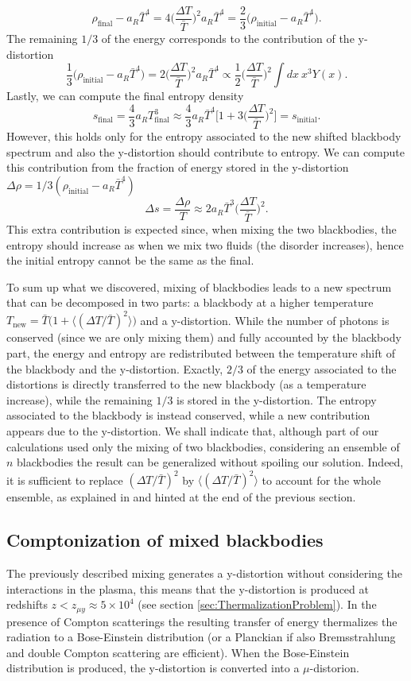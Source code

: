 $$\rho_\text{final}-a_R \bar T^4=4\bigg(\frac{\Delta T}{\bar T}\bigg)^2a_R\bar T^4=\frac{2}{3}\bigg(\rho_\text{initial}-a_R \bar T^4\bigg).$$
The remaining $1/3$ of the energy corresponds to the contribution of the y-distortion
$$\frac{1}{3}\bigg(\rho_\text{initial}-a_R \bar T^4\bigg)=2\bigg(\frac{\Delta T}{\bar T}\bigg)^2a_R\bar T^4\propto\frac{1}{2}\bigg(\frac{\Delta T}{\bar T}\bigg)^2\int dx\ x^3 Y(x).$$
Lastly, we can compute the final entropy density$$ s_\text{final}=\frac{4}{3}a_RT_\text{final}^3\approx\frac{4}{3}a_R \bar T^4\bigg[1+3\bigg(\frac{\Delta T}{\bar T}\bigg)^2\bigg]=s_\text{initial}.$$ However, this holds only for the entropy associated to the new shifted blackbody spectrum and also the y-distortion should contribute to entropy. We can compute this contribution from the fraction of energy stored in the y-distortion $\Delta \rho = 1/3(\rho_\text{initial}-a_R \bar T^4)$
$$\Delta s=\frac{\Delta \rho}{T}\approx 2a_R \bar T^3\bigg(\frac{\Delta T}{\bar T}\bigg)^2.$$
This extra contribution is expected since, when mixing the two blackbodies, the entropy should increase as when we mix two fluids (the disorder increases), hence the initial entropy cannot be the same as the final.

To sum up what we discovered, mixing of blackbodies leads to a new spectrum that can be decomposed in two parts: a blackbody at a higher temperature $T_\text{new}=\bar T\big(1+\langle(\Delta T/\bar T)^2\rangle\big)$ and a y-distortion. While the number of photons is conserved (since we are only mixing them) and fully accounted by the blackbody part, the energy and entropy are redistributed between the temperature shift of the blackbody and the y-distortion. Exactly, $2/3$ of the energy associated to the distortions is directly transferred to the new blackbody (as a temperature increase), while the remaining $1/3$ is stored in the y-distortion. The entropy associated to the blackbody is instead conserved, while a new contribution appears due to the y-distortion. We shall indicate that, although part of our calculations used only the mixing of two blackbodies, considering an ensemble of $n$ blackbodies the result can be generalized without spoiling our solution. Indeed, it is sufficient to replace $(\Delta T/\bar T)^2$ by $\langle(\Delta T/\bar T)^2\rangle$ to account for the whole ensemble, as explained in \cite{MixingBB} and hinted at the end of the previous section.
\subsection{Comptonization of mixed blackbodies}
\label{sec:MixSD_Comportonization}
The previously described mixing generates a y-distortion without considering the interactions in the plasma, this means that the y-distortion is produced at redshifts $z<z_{\mu y}\approx 5\times 10^4$ (see section \ref{sec:ThermalizationProblem}). In the presence of Compton scatterings the resulting transfer of energy thermalizes the radiation to a Bose-Einstein distribution (or a Planckian if also Bremsstrahlung and double Compton scattering are efficient). When the Bose-Einstein distribution is produced, the y-distortion is converted into a $\mu$-distorion. 

